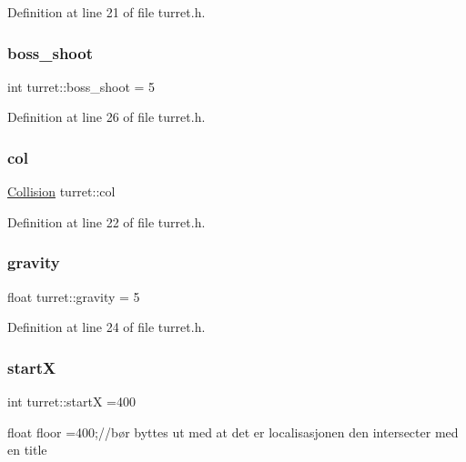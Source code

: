 Definition at line 21 of file turret.\+h.

\hypertarget{classturret_abd8cba4229f37940856dc62d9f3a62eb}{}\label{classturret_abd8cba4229f37940856dc62d9f3a62eb} 
\subsubsection{\texorpdfstring{boss\+\_\+shoot}{boss\_shoot}}
{\footnotesize\ttfamily int turret\+::boss\+\_\+shoot = 5}



Definition at line 26 of file turret.\+h.

\hypertarget{classturret_a7a0448d6a1fdbe3d817dfad07a77fee6}{}\label{classturret_a7a0448d6a1fdbe3d817dfad07a77fee6} 
\subsubsection{\texorpdfstring{col}{col}}
{\footnotesize\ttfamily \hyperlink{class_collision}{Collision} turret\+::col}



Definition at line 22 of file turret.\+h.

\hypertarget{classturret_a816c6ed6f6d915854f94f177b9810619}{}\label{classturret_a816c6ed6f6d915854f94f177b9810619} 
\subsubsection{\texorpdfstring{gravity}{gravity}}
{\footnotesize\ttfamily float turret\+::gravity = 5}



Definition at line 24 of file turret.\+h.

\hypertarget{classturret_a1ca28235d997ed88d28996d83e400061}{}\label{classturret_a1ca28235d997ed88d28996d83e400061} 
\subsubsection{\texorpdfstring{startX}{startX}}
{\footnotesize\ttfamily int turret\+::startX =400}



float floor =400;//bør byttes ut med at det er localisasjonen den intersecter med en title 



